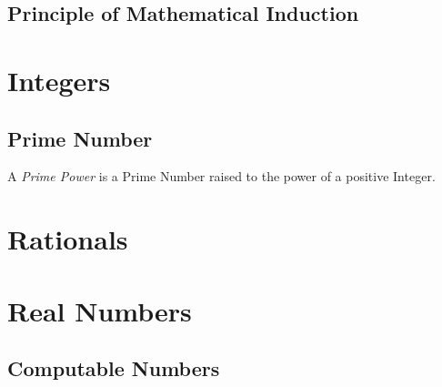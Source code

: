 \subsection{Principle of Mathematical Induction}
\label{sec:induction_principle}



\section{Integers}\label{sec:integer}

\subsection{Prime Number}\label{sec:prime_number}

A \emph{Prime Power} is a Prime Number raised to the power of a
positive Integer.



\section{Rationals}\label{sec:rational}



\section{Real Numbers}\label{sec:real_number}

\subsection{Computable Numbers}\label{sec:computable_real}

